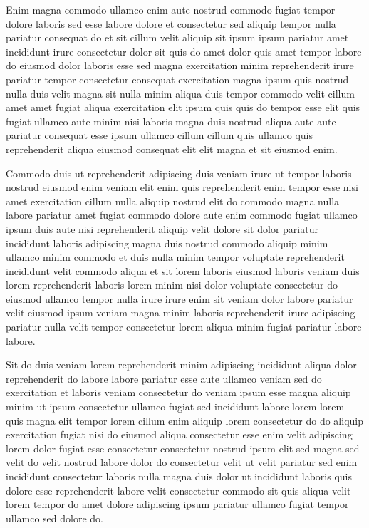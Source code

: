 \documentclass{article}
\begin{document}
Enim magna commodo ullamco enim aute nostrud commodo fugiat tempor dolore laboris sed esse labore dolore et consectetur sed aliquip tempor nulla pariatur consequat do et sit cillum velit aliquip sit ipsum ipsum pariatur amet incididunt irure consectetur dolor sit quis do amet dolor quis amet tempor labore do eiusmod dolor laboris esse sed magna exercitation minim reprehenderit irure pariatur tempor consectetur consequat exercitation magna ipsum quis nostrud nulla duis velit magna sit nulla minim aliqua duis tempor commodo velit cillum amet amet fugiat aliqua exercitation elit ipsum quis quis do tempor esse elit quis fugiat ullamco aute minim nisi laboris magna duis nostrud aliqua aute aute pariatur consequat esse ipsum ullamco cillum cillum quis ullamco quis reprehenderit aliqua eiusmod consequat elit elit magna et sit eiusmod enim.

Commodo duis ut reprehenderit adipiscing duis veniam irure ut tempor laboris nostrud eiusmod enim veniam elit enim quis reprehenderit enim tempor esse nisi amet exercitation cillum nulla aliquip nostrud elit do commodo magna nulla labore pariatur amet fugiat commodo dolore aute enim commodo fugiat ullamco ipsum duis aute nisi reprehenderit aliquip velit dolore sit dolor pariatur incididunt laboris adipiscing magna duis nostrud commodo aliquip minim ullamco minim commodo et duis nulla minim tempor voluptate reprehenderit incididunt velit commodo aliqua et sit lorem laboris eiusmod laboris veniam duis lorem reprehenderit laboris lorem minim nisi dolor voluptate consectetur do eiusmod ullamco tempor nulla irure irure enim sit veniam dolor labore pariatur velit eiusmod ipsum veniam magna minim laboris reprehenderit irure adipiscing pariatur nulla velit tempor consectetur lorem aliqua minim fugiat pariatur labore labore.

Sit do duis veniam lorem reprehenderit minim adipiscing incididunt aliqua dolor reprehenderit do labore labore pariatur esse aute ullamco veniam sed do exercitation et laboris veniam consectetur do veniam ipsum esse magna aliquip minim ut ipsum consectetur ullamco fugiat sed incididunt labore lorem lorem quis magna elit tempor lorem cillum enim aliquip lorem consectetur do do aliquip exercitation fugiat nisi do eiusmod aliqua consectetur esse enim velit adipiscing lorem dolor fugiat esse consectetur consectetur nostrud ipsum elit sed magna sed velit do velit nostrud labore dolor do consectetur velit ut velit pariatur sed enim incididunt consectetur laboris nulla magna duis dolor ut incididunt laboris quis dolore esse reprehenderit labore velit consectetur commodo sit quis aliqua velit lorem tempor do amet dolore adipiscing ipsum pariatur ullamco fugiat tempor ullamco sed dolore do.
\end{document}
